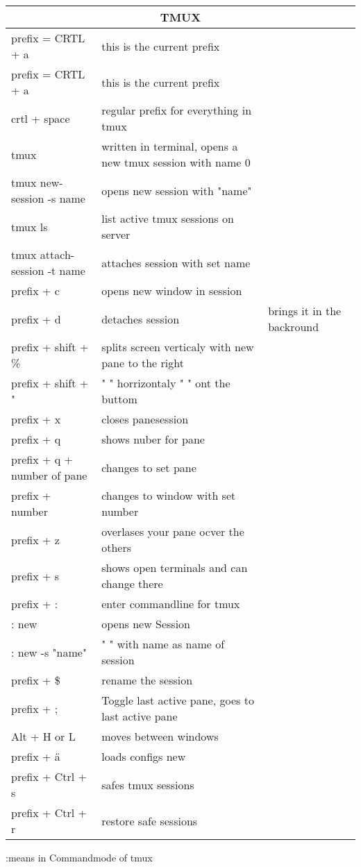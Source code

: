 \documentclass[12pt]{article}
\begin{document}

\begin{tabular}{| p{6.5cm} | p{6.5cm} | p{6.5cm} |}
    \hline
    \multicolumn{3}{|c|}{TMUX} \\
    \hline
    prefix = CRTL + a & this is the current prefix &\\
    \hline
    prefix = CRTL + a & this is the current prefix &\\
    \hline
    crtl + space & regular prefix for everything in tmux & \\
    \hline
    tmux & written in terminal, opens a new tmux session with name 0 & \\
    \hline
    tmux new-session -s name & opens new session with "name" & \\
    \hline 
    tmux ls & list active tmux sessions on server & \\
    \hline
    tmux attach-session -t name & attaches session with set name & \\
    \hline 
    prefix + c & opens new window in session & \\
    \hline
    prefix + d & detaches session & brings it in the backround \\
    \hline
    prefix + shift + \% & splits screen verticaly with new pane to the right & \\
    \hline
    prefix + shift + " & " " horrizontaly " " ont the buttom & \\
    \hline 
    prefix + x & closes pane\/session & \\
    \hline 
    prefix + q & shows nuber for pane & \\
    \hline 
    prefix + q + number of pane & changes to set pane & \\
    \hline
    prefix + number & changes to window with set number & \\
    \hline
    prefix + z & overlases your pane ocver the others & \\
    \hline
    prefix + s & shows open terminals and can change there & \\
    \hline
    prefix + : & enter commandline for tmux & \\
    \hline
    : new & opens new Session & \\
    \hline
    : new -s "name" & " " with name as name of session & \\
    \hline
    prefix + \$ & rename the session & \\
    \hline
    prefix + ; & Toggle last active pane, goes to last active pane &\\
    \hline
    Alt + H or L & moves between windows & \\
    \hline 
    prefix + ä & loads configs new & \\
    \hline
    prefix + Ctrl + s & safes tmux sessions & \\
    \hline 
    prefix + Ctrl + r & restore safe sessions & \\
        \hline
\end{tabular}
 :means in Commandmode of tmux
\newpage
\end{document}
